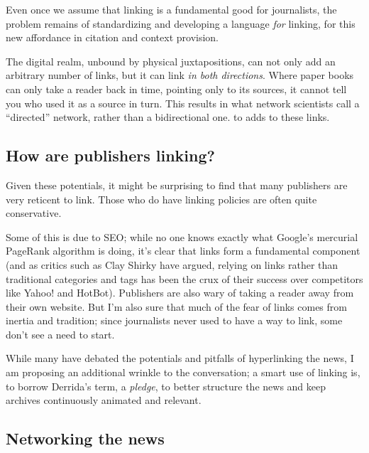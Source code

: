 Even once we assume that linking is a fundamental good for journalists, the problem remains of standardizing and developing a language \emph{for} linking, for this new affordance in citation and context provision.

The digital realm, unbound by physical juxtapositions, can not only add an arbitrary number of links, but it can link \emph{in both directions}. Where paper books can only take a reader back in time, pointing only to its sources, it cannot tell you who used it as a source in turn. This results in what network scientists call a ``directed'' network, rather than a bidirectional one. to adds to these links.

\subsection{How are publishers linking?}

Given these potentials, it might be surprising to find that many publishers are very reticent to link. Those who do have linking policies are often quite conservative.


Some of this is due to SEO; while no one knows exactly what Google's mercurial PageRank algorithm is doing, it's clear that links form a fundamental component (and as critics such as Clay Shirky have argued, relying on links rather than traditional categories and tags has been the crux of their success over competitors like Yahoo! and HotBot).\autocite{} Publishers are also wary of taking a reader away from their own website. But I'm also sure that much of the fear of links comes from inertia and tradition; since journalists never used to have a way to link, some don't see a need to start.

While many have debated the potentials and pitfalls of hyperlinking the news, I am proposing an additional wrinkle to the conversation; a smart use of linking is, to borrow Derrida's term, a \emph{pledge}, to better structure the news and keep archives continuously animated and relevant.

\subsection{Networking the news}

